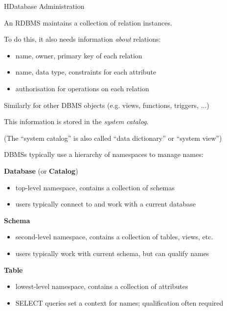 \begin{lecture}{H}{Database Administration}
\begin{slide}
\end{slide}

\begin{slide}
An RDBMS maintains a collection of relation instances.

To do this, it also needs information {\em{about}} relations:
\begin{itemize}
\item name, owner, primary key of each relation
\item name, data type, constraints for each attribute
\item authorisation for operations on each relation
\end{itemize}
Similarly for other DBMS objects {\small (e.g. views, functions, triggers, ...)}

This information is stored in the {\em{system catalog}}.

{\small 
(The ``system catalog'' is also called ``data dictionary'' or ``system view'')
}
\end{slide}

\begin{slide}
DBMSs typically use a hierarchy of namespaces to manage names:

{\bf{Database}} {\small (or {\bf{Catalog}})}
{\small 
\begin{itemize}
\vspace{-1ex}\item top-level namespace, contains a collection of schemas
\vspace{-1ex}\item users typically connect to and work with a current database
\end{itemize}
}
{\bf{Schema}}
{\small 
\begin{itemize}
\vspace{-1ex}\item second-level namespace, contains a collection of tables, views, etc.
\vspace{-1ex}\item users typically work with current schema, but can qualify names
\end{itemize}
}
{\bf{Table}}
{\small 
\begin{itemize}
\vspace{-1ex}\item lowest-level namespace, contains a collection of attributes
\vspace{-1ex}\item SELECT queries set a context for names; qualification often required
\end{itemize}
}
\end{slide}


\end{lecture}
